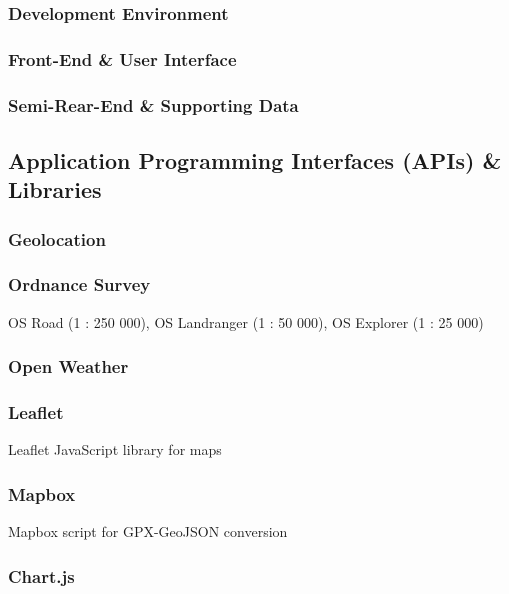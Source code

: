 \documentclass[11pt, english]{article}
\begin{document}
		\subsubsection{Development Environment}

		\subsubsection{Front-End \& User Interface}

		\subsubsection{Semi-Rear-End \& Supporting Data}

	\subsection{Application Programming Interfaces (APIs) \& Libraries}

		\subsubsection{Geolocation}

		\subsubsection{Ordnance Survey}

		OS Road (1 : 250 000), OS Landranger (1 : 50 000), OS Explorer (1 : 25 000)\\

		\subsubsection{Open Weather}

		\subsubsection{Leaflet}

		Leaflet JavaScript library for maps

		\subsubsection{Mapbox}

		Mapbox script for GPX-GeoJSON conversion

		\subsubsection{Chart.js}
\end{document}

